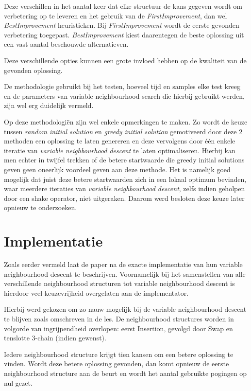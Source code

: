 \documentclass[pdftex,12pt,a4paper]{article}
\begin{document}
Deze verschillen in het aantal keer dat elke structuur de kans gegeven wordt om verbetering op te leveren en het gebruik van de \emph{FirstImprovement}, dan wel \emph{BestImprovement} heuristieken. Bij \emph{FirstImprovement} wordt de eerste gevonden verbetering toegepast. \emph{BestImprovement} kiest daarentegen de beste oplossing uit een vast aantal beschouwde alternatieven.

Deze verschillende opties kunnen een grote invloed hebben op de kwaliteit van de gevonden oplossing.

De methodologie gebruikt bij het testen, hoeveel tijd en samples elke test kreeg en de parameters van variable neighbourhood search die hierbij gebruikt werden, zijn wel erg duidelijk vermeld.

Op deze methodologi\"en zijn wel enkele opmerkingen te maken. Zo wordt de keuze tussen \emph{random initial solution} en \emph{greedy initial solution} gemotiveerd door deze 2 methoden een oplossing te laten genereren en deze vervolgens door \'e\'en enkele iteratie van \emph{variable neighbourhood descent} te laten optimaliseren. 
Hierbij kan men echter in twijfel trekken of de betere startwaarde die greedy initial solutions geven  geen oneerlijk voordeel geven aan deze methode. Het is namelijk goed mogelijk dat juist deze betere startwaarden zich in een lokaal optimum bevinden, waar meerdere iteraties van \emph{variable neighbourhood descent}, zelfs indien geholpen door een shake operator, niet uitgeraken. Daarom werd besloten deze keuze later opnieuw te onderzoeken.

\section{Implementatie}
Zoals eerder vermeld laat de paper na de exacte implementatie van hun variable neighbourhood descent te beschrijven. Voornamelijk bij het samenstellen van alle verschillende neighbourhood structuren tot variable neighbourhood descent is hierdoor veel keuzevrijheid overgelaten aan de implementator.

Hierbij werd gekozen om zo nauw mogelijk bij de variable neighbourhood descent te blijven zoals omschreven in de les. De neighbourhood structures worden in volgorde van ingrijpendheid overlopen: eerst Insertion, gevolgd door Swap en tenslotte 3-chain (indien gewenst).

Iedere neighbourhood structure krijgt tien kansen om een betere oplossing te vinden. Wordt deze betere oplossing gevonden, dan komt opnieuw de eerste neighbourhood structure aan de beurt en wordt het aantal gebruikte pogingen op nul gezet.
\end{document}
